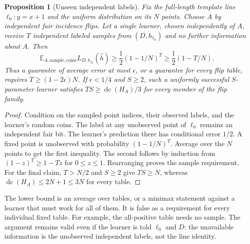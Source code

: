 \documentclass[11pt]{article}
\newtheorem{proposition}[theorem]{Proposition}
\DeclareMathOperator{\dc}{dc}
\newcommand{\E}{\mathbb E}
\newcommand{\1}{\mathbf 1}
\begin{document}
\begin{samepage}
\begin{proposition}[Unseen independent labels]\label{prop:unseen}
Fix the full-length template line $\ell_0:y=x+1$ and the uniform distribution on its $N$ points. Choose $A$ by independent fair incidence flips. Let a single learner, chosen independently of $A$, receive $T$ independent labeled samples from $(D,h_{\ell_0})$ and no further information about $A$. Then
\[
 \E_{A,\mathrm{sample},\mathrm{coins}}L_{D,h_{\ell_0}}(\widehat h)
 \ge\frac12(1-1/N)^T
 \ge\frac12(1-T/N).
\]
Thus a guarantee of average error at most $\epsilon$, or a guarantee for every flip table, requires $T\ge(1-2\epsilon)N$. If $\epsilon<1/4$ and $S\ge2$, such a uniformly successful $S$-parameter learner satisfies $TS\ge\dc(H_A)/3$ for every member of the flip family.
\end{proposition}
\end{samepage}
\begin{proof}
Condition on the sampled point indices, their observed labels, and the learner's random coins. The label at any unobserved point of $\ell_0$ remains an independent fair bit. The learner's prediction there has conditional error $1/2$. A fixed point is unobserved with probability $(1-1/N)^T$. Average over the $N$ points to get the first inequality. The second follows by induction from $(1-z)^T\ge1-Tz$ for $0\le z\le1$. Rearranging proves the sample requirement. For the final claim, $T>N/2$ and $S\ge2$ give $TS\ge N$, whereas $\dc(H_A)\le2N+1\le3N$ for every table.
\end{proof}

The lower bound is an average over tables, or a minimax statement against a learner that must work for all of them. It is false as a requirement for every individual fixed table. For example, the all-positive table needs no sample. The argument remains valid even if the learner is told $\ell_0$ and $D$: the unavailable information is the unobserved independent labels, not the line identity.
\end{document}
